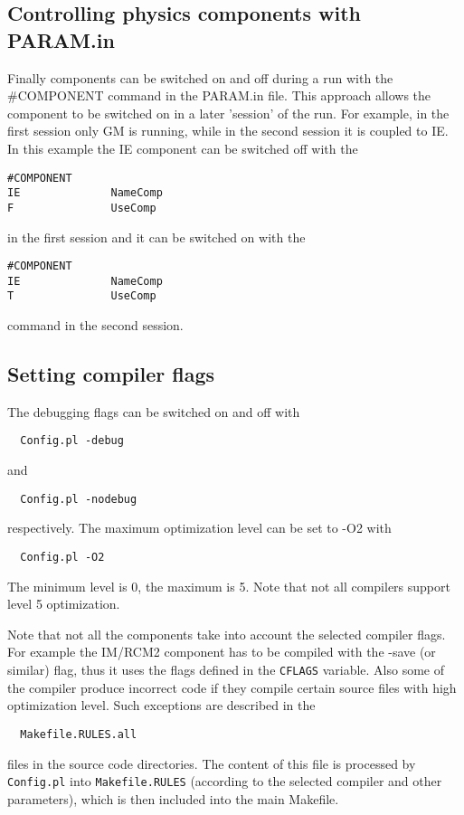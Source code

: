 \subsection{Controlling physics components with PARAM.in}

Finally components can be switched on and off during a run
with the \#COMPONENT command in the PARAM.in file. 
This approach allows the component to be switched on in a later 
'session' of the run. For example, in the first session only GM 
is running, while in the second session it is coupled to IE. 
In this example the IE component can be switched off with the
\begin{verbatim}
#COMPONENT
IE              NameComp
F               UseComp
\end{verbatim}
in the first session and it can be switched on with the
\begin{verbatim}
#COMPONENT
IE              NameComp
T               UseComp
\end{verbatim}
command in the second session.

\subsection{Setting compiler flags}

The debugging flags can be switched on and off with
\begin{verbatim}
  Config.pl -debug
\end{verbatim}
and
\begin{verbatim}
  Config.pl -nodebug
\end{verbatim}
respectively. The maximum optimization level can be set to -O2 with
\begin{verbatim}
  Config.pl -O2
\end{verbatim}
The minimum level is 0, the maximum is 5. Note that not all compilers support
level 5 optimization.

Note that not all the components take into account the selected
compiler flags. For example the IM/RCM2 component has to be compiled 
with the -save (or similar) flag, thus it uses the flags defined in the 
{\tt CFLAGS} variable. Also some of the compiler produce incorrect
code if they compile certain source files with high optimization level.
Such exceptions are described in the 
\begin{verbatim}
  Makefile.RULES.all
\end{verbatim}
files in the source code directories. The content of this file
is processed by {\tt Config.pl} into {\tt Makefile.RULES}
(according to the selected compiler and other parameters),  
which is then included into the main Makefile. 

